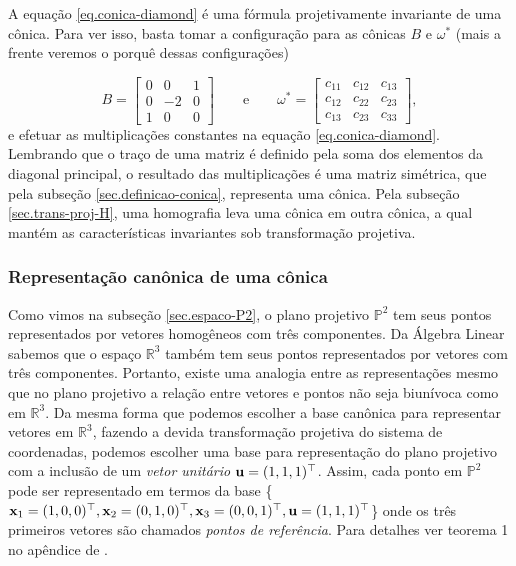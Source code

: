 A equação \ref{eq.conica-diamond} é uma fórmula projetivamente invariante de uma cônica. Para ver isso, basta tomar a configuração para as cônicas $B$ e $\omega^*$ (mais a frente veremos o porquê dessas configurações)

\begin{equation*}
B=
\begin{bmatrix}
0&0&1\\
0&-2&0\\
1&0&0
\end{bmatrix}
\qquad\text{e}\qquad
\omega^*=
\begin{bmatrix}
c_{11}&c_{12}&c_{13}\\
c_{12}&c_{22}&c_{23}\\
c_{13}&c_{23}&c_{33}
\end{bmatrix},
\end{equation*} 
e efetuar as multiplicações constantes na equação \ref{eq.conica-diamond}. Lembrando que o traço de uma matriz é definido pela soma dos elementos da diagonal principal, o resultado das multiplicações é uma matriz simétrica, que pela subseção \ref{sec.definicao-conica}, representa uma cônica. Pela subseção \ref{sec.trans-proj-H}, uma homografia leva uma cônica em outra cônica, a qual mantém as características invariantes sob transformação projetiva.

\subsubsection{Representação canônica de uma cônica}\label{sec.forma-canonica-B}

Como vimos na subseção \ref{sec.espaco-P2}, o plano projetivo $\mathbb{P}^2$ tem seus pontos representados por vetores homogêneos com três componentes. Da Álgebra Linear sabemos que o espaço $\mathbb{R}^3$ também tem seus pontos representados por vetores com três componentes. Portanto, existe uma analogia entre as representações mesmo que no plano projetivo a relação entre vetores e pontos não seja biunívoca como em $\mathbb{R}^3$. Da mesma forma que podemos escolher a base canônica para representar vetores em $\mathbb{R}^3$, fazendo a devida transformação projetiva do sistema de coordenadas, podemos escolher uma base para representação do plano projetivo com a inclusão de um \textit{vetor unitário} ${\bf u}=(1,1,1)^\top$. Assim, cada ponto em $\mathbb{P}^2$ pode ser representado em termos da base \{$\mathbf{x}_1=(1,0,0)^\top,\mathbf{x}_2=(0,1,0)^\top,\mathbf{x}_3=(0,0,1)^\top,{\bf u}=(1,1,1)^\top$\} onde os três primeiros vetores são chamados {\it pontos de referência}. Para detalhes ver teorema 1 no apêndice  de \citep{kneebone}.

